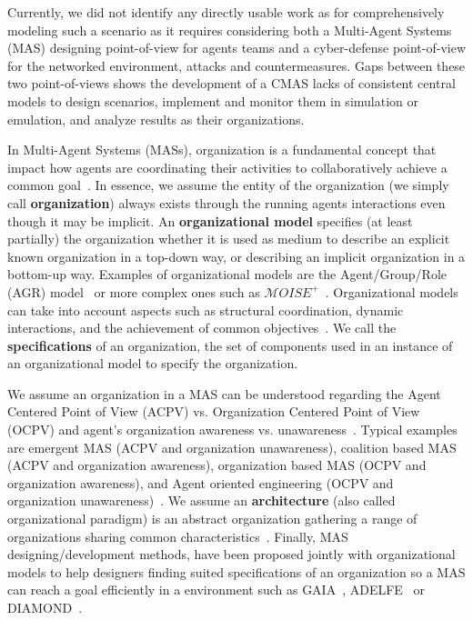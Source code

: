 \documentclass[runningheads]{llncs}
\begin{document}
Currently, we did not identify any directly usable work as for comprehensively modeling such a scenario as it requires considering both a Multi-Agent Systems (MAS) designing point-of-view for agents teams and a cyber-defense point-of-view for the networked environment, attacks and countermeasures.
Gaps between these two point-of-views shows the development of a CMAS lacks of consistent central models to design scenarios, implement and monitor them in simulation or emulation, and analyze results as their organizations.

In Multi-Agent Systems (MASs), organization is a fundamental concept that impact how agents are coordinating their activities to collaboratively achieve a common goal~\cite{Hubner2002}. In essence, we assume the entity of the organization (we simply call \textbf{organization}) always exists through the running agents interactions even though it may be implicit.
An \textbf{organizational model} specifies (at least partially) the organization whether it is used as medium to describe an explicit known organization in a top-down way, or describing an implicit organization in a bottom-up way. Examples of organizational models are the Agent/Group/Role (AGR) model~\cite{Ferber2004} or more complex ones such as $\mathcal{M}OISE^{+}$~\cite{Hubner2002}. Organizational models can take into account aspects such as structural coordination, dynamic interactions, and the achievement of common objectives~\cite{Ferber2004, Abbas2015}. We call the \textbf{specifications} of an organization, the set of components used in an instance of an organizational model to specify the organization.

We assume an organization in a MAS can be understood regarding the Agent Centered Point of View (ACPV) vs. Organization Centered Point of View (OCPV) and agent's organization awareness vs. unawareness~\cite{Picard2009}.
Typical examples are emergent MAS (ACPV and organization unawareness), coalition based MAS (ACPV and organization awareness), organization based MAS (OCPV and organization awareness), and Agent oriented engineering (OCPV and organization unawareness)~\cite{Picard2009}.
We assume an \textbf{architecture} (also called organizational paradigm) is an abstract organization gathering a range of organizations sharing common characteristics~\cite{Horling2004}. Finally, MAS designing/development methods, have been proposed jointly with organizational models to help designers finding suited specifications of an organization so a MAS can reach a goal efficiently in a environment such as GAIA~\cite{Wooldridge2000}, ADELFE~\cite{Bernon2003} or DIAMOND~\cite{Jamont2005}.
\end{document}
